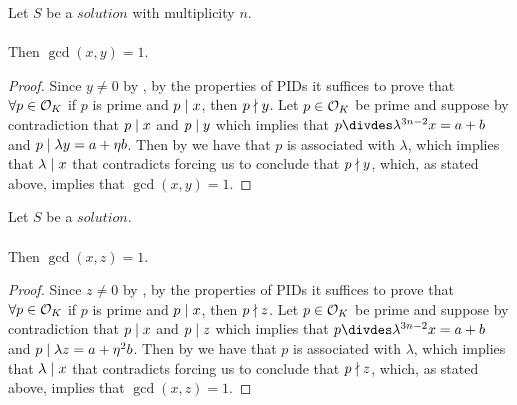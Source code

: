 \begin{lemma}
    \label{lmm:coprime_x_y}
    \leanok
    Let $S$ be a $solution$ with multiplicity $n$.\\\\
    Then $\gcd(x,y) = 1$.
\end{lemma}
\begin{proof}
    \leanok
    Since $y \neq 0$ by , by the properties of PIDs it suffices to prove that
    $\forall p \in \mathcal{O}_K$ if $p$ is prime and $p \mid x$, then $p \nmid y$.
    Let $p \in \mathcal{O}_K$ be prime and suppose by contradiction that $p \mid x$ and $p \mid y$
    which implies that $p \divdes \lambda^{3n-2} x = a+b$ and $p \mid \lambda y = a + \eta b$.
    Then by 
    we have that $p$ is associated with $\lambda$, which implies that $\lambda \mid x$
    that contradicts  forcing us to conclude that $p \nmid y$, which,
    as stated above, implies that $\gcd(x,y)=1$.
\end{proof}

\begin{lemma}
    \label{lmm:coprime_x_z}
    \leanok
    Let $S$ be a $solution$.\\\\
    Then $\gcd(x,z) = 1$.
\end{lemma}
\begin{proof}
    \leanok
    Since $z \neq 0$ by , by the properties of PIDs it suffices to prove that
    $\forall p \in \mathcal{O}_K$ if $p$ is prime and $p \mid x$, then $p \nmid z$.
    Let $p \in \mathcal{O}_K$ be prime and suppose by contradiction that $p \mid x$ and $p \mid z$
    which implies that $p \divdes \lambda^{3n-2} x = a+b$ and $p \mid \lambda z = a + \eta^2 b$.
    Then by 
    we have that $p$ is associated with $\lambda$, which implies that $\lambda \mid x$
    that contradicts  forcing us to conclude that $p \nmid z$, which,
    as stated above, implies that $\gcd(x,z)=1$.
\end{proof}

